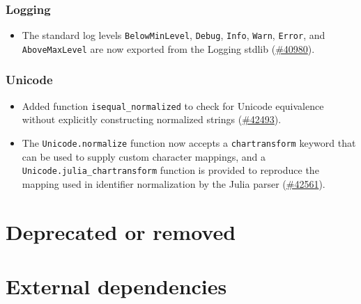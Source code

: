 \hypertarget{10954107756881793102}{}


\subsection{Logging}



\begin{itemize}
\item The standard log levels \texttt{BelowMinLevel}, \texttt{Debug}, \texttt{Info}, \texttt{Warn}, \texttt{Error}, and \texttt{AboveMaxLevel} are now exported from the Logging stdlib (\href{https://github.com/JuliaLang/julia/issues/40980}{\#40980}).

\end{itemize}


\hypertarget{1111253146082274876}{}


\subsection{Unicode}



\begin{itemize}
\item Added function \texttt{isequal\_normalized} to check for Unicode equivalence without explicitly constructing normalized strings (\href{https://github.com/JuliaLang/julia/issues/42493}{\#42493}).


\item The \texttt{Unicode.normalize} function now accepts a \texttt{chartransform} keyword that can be used to supply custom character mappings, and a \texttt{Unicode.julia\_chartransform} function is provided to reproduce the mapping used in identifier normalization by the Julia parser (\href{https://github.com/JuliaLang/julia/issues/42561}{\#42561}).

\end{itemize}


\hypertarget{4235524591664155207}{}


\chapter{Deprecated or removed}



\hypertarget{1328894012787811563}{}


\chapter{External dependencies}



